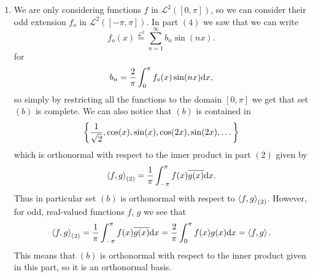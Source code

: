 \documentclass[11pt,a4paper]{article}
\begin{document}
\begin{solution}
\begin{enumerate}
\begin{enumerate}
          \[
            \ip{f}{g}_{(2)} =
            \frac{1}{\pi} \int_{-\pi}^{\pi} f(x) \overline{g(x)} \dx =
            \frac{2}{\pi} \int_{0}^{\pi} f(x) g(x) \dx =
            \ip{f}{g}.
          \]
          This means that $(a)$ is orthonormal with respect to the inner
          product given in this part, so it is an orthonormal basis.
        \item[(b)] We are only considering functions $f$ in $\mathcal L^2([0,\pi])$,
          so we can consider their odd extension $f_o$ in $\mathcal L^2([-\pi,\pi])$.
          In part $(4)$ we saw that we can write
          \[
            f_o(x) \overset{\mathcal L^2}{=} \sum_{n=1}^{\infty} b_n \sin(nx).
          \]
          for
          \[
            b_n =
            \frac{2}{\pi} \int_{0}^{\pi} f_o(x) \sin(nx) \dx,
          \]
          so simply by restricting all the functions to the domain
          $[0,\pi]$ we get that set $(b)$ is complete.
          We can also notice that $(b)$ is contained in
          \[
            \left\{\frac{1}{\sqrt{2}}, \cos(x), \sin(x), \cos(2x), \sin(2x),\dots\right\}
          \]
          which is orthonormal with respect to the inner product in
          part $(2)$ given by
          \[
            \ip{f}{g}_{(2)} =
            \frac{1}{\pi} \int_{-\pi}^{\pi} f(x) \overline{g(x)} \dx.
          \]
          Thus in particular set $(b)$ is orthonormal with respect to
          $\left\langle f, g \right\rangle_{(2)}$.
          However, for odd, real-valued functions $f$, $g$ we see that
          \[
            \ip{f}{g}_{(2)} =
            \frac{1}{\pi} \int_{-\pi}^{\pi} f(x) \overline{g(x)} \dx =
            \frac{2}{\pi} \int_{0}^{\pi} f(x) g(x) \dx =
            \ip{f}{g}.
          \]
          This means that $(b)$ is orthonormal with respect to the inner
          product given in this part, so it is an orthonormal basis.
      \end{enumerate}
  \end{enumerate}
\end{solution}
\end{document}
